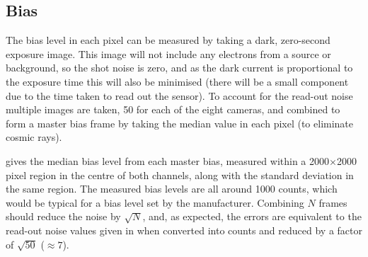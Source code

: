 
\subsection{Bias}
\label{sec:bias}
\begin{colsection}

The bias level in each pixel can be measured by taking a dark, zero-second exposure image. This image will not include any electrons from a source or background, so the shot noise is zero, and as the dark current is proportional to the exposure time this will also be minimised (there will be a small component due to the time taken to read out the sensor). To account for the read-out noise multiple images are taken, 50 for each of the eight cameras, and combined to form a master bias frame by taking the median value in each pixel (to eliminate cosmic rays).

 gives the median bias level from each master bias, measured within a 2000$\times$2000 pixel region in the centre of both channels, along with the standard deviation in the same region. The measured bias levels are all around 1000 counts, which would be typical for a bias level set by the manufacturer. Combining $N$ frames should reduce the noise by $\sqrt{N}$, and, as expected, the errors are equivalent to the read-out noise values given in  when converted into counts and reduced by a factor of $\sqrt{50}$ ($\approx 7$).


\end{colsection}
